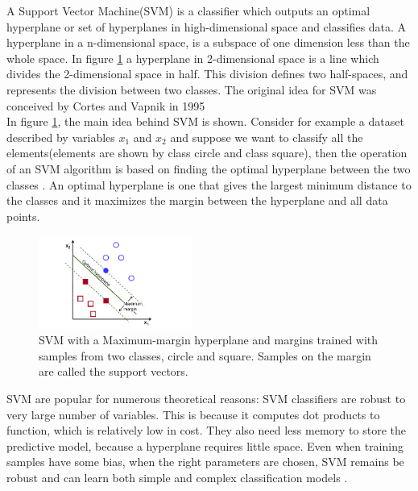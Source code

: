 A Support Vector Machine(SVM) is a classifier which outputs an optimal hyperplane or set of hyperplanes in high-dimensional space and classifies data. A hyperplane in a n-dimensional space, is a subspace of one dimension less than the whole space. In figure \ref{fig:SVM} a hyperplane in 2-dimensional space is a line which divides the 2-dimensional space in half. This division defines two half-spaces, and represents the division between two classes. The original idea for SVM was conceived by Cortes and Vapnik in 1995 \cite{cortes1995support} \\
In figure \ref{fig:SVM}, the main idea behind SVM is shown. Consider for example a dataset described by variables $x_1$ and $x_2$ and suppose we want to classify all the elements(elements are shown by class circle and class square), then the operation of an SVM algorithm is based on finding the optimal hyperplane between the two classes \cite{opencv_library}. An optimal hyperplane is one that gives the largest minimum distance to the classes and it maximizes the margin between the hyperplane and all data points. %

\begin{figure}[H]
    \includegraphics[width=0.45\textwidth]{./img/SVM.png}
    \caption{\footnotesize{SVM with a Maximum-margin hyperplane and margins trained with samples from two classes, circle and square. Samples on the margin are called the support vectors.\cite{wiki:SVM}}}
    \label{fig:SVM}
\end{figure}


SVM are popular for numerous theoretical reasons: SVM classifiers are robust to very large number of variables. This is because it computes dot products to function, which is relatively low in cost. They %
also need less memory to store the predictive model, because a hyperplane requires little space. Even when training samples have some bias, when the right parameters are chosen, SVM  remains be robust \cite{auria2008support} and can learn both simple and complex classification models \cite{cristianini2000}. 

